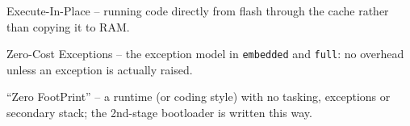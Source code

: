 \begin{description}[style=nextline, leftmargin=0pt]
\item[XIP] Execute-In-Place -- running code directly from flash through the cache
  rather than copying it to RAM.

\item[ZCX] Zero-Cost Exceptions -- the exception model in \texttt{embedded} and
  \texttt{full}: no overhead unless an exception is actually raised.

\item[ZFP] ``Zero FootPrint'' -- a runtime (or coding style) with no tasking,
  exceptions or secondary stack; the 2nd-stage bootloader is written this way.

\end{description}
